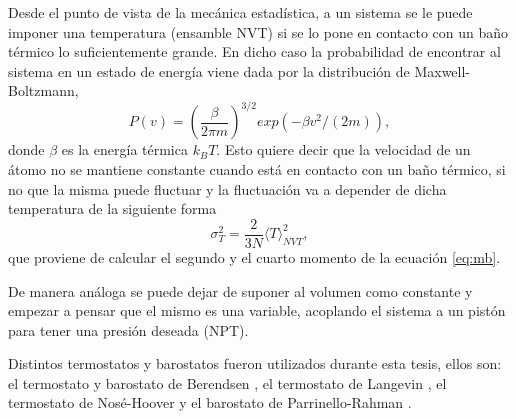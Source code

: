 Desde el punto de vista de la mecánica estadística, a un sistema se le puede 
imponer una temperatura (ensamble NVT) si se lo pone en contacto con un baño 
térmico lo suficientemente grande. En dicho caso la probabilidad de encontrar al 
sistema en un estado de energía viene dada por la distribución de 
Maxwell-Boltzmann,
\begin{equation}\label{eq:mb}
    P(v) = \left( \frac{\beta}{2\pi m} \right)^{3/2} exp(-\beta v^2 / (2m)),
\end{equation}
donde $\beta$ es la energía térmica $k_B T$. Esto quiere decir que la velocidad 
de un átomo no se mantiene constante cuando está en contacto con un baño térmico, 
si no que la misma puede fluctuar y la fluctuación va a depender de dicha 
temperatura de la siguiente forma
\begin{equation}
    \sigma_T^2 = \frac{2}{3 N} \langle T \rangle_{NVT}^2,
\end{equation}
que proviene de calcular el segundo y el cuarto momento de la ecuación 
\ref{eq:mb}.

De manera análoga se puede dejar de suponer al volumen como constante y empezar a
pensar que el mismo es una variable, acoplando el sistema a un pistón para tener
una presión deseada (NPT).

Distintos termostatos y barostatos fueron utilizados durante esta tesis, ellos 
son: el termostato y barostato de Berendsen \cite{berendsen1984}, el termostato 
de Langevin \cite{schneider1978, kroger2005}, el termostato de Nosé-Hoover 
\cite{nose1984a, nose1984b, hoover1985} y el barostato de Parrinello-Rahman
\cite{parrinello-rahman}.
